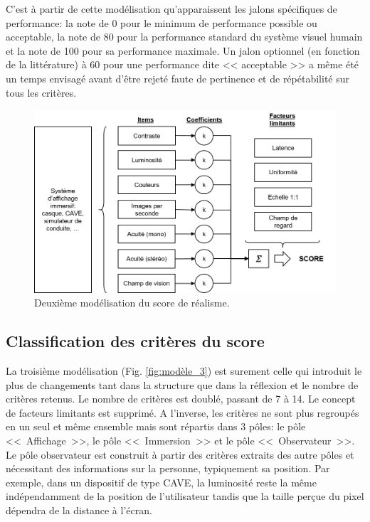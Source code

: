 	\par C'est à partir de cette modélisation qu'apparaissent les jalons spécifiques de performance: la note de 0 pour le minimum de performance possible ou acceptable, la note de 80 pour la performance standard du système visuel humain et la note de 100 pour sa performance maximale. Un jalon optionnel (en fonction de la littérature) à 60 pour une performance dite << acceptable >> a même été un temps envisagé avant d'être rejeté faute de pertinence et de répétabilité sur tous les critères.
	
	\begin{figure}[h]
		\centering
		\includegraphics[scale=.8]{Figures/Modele2_2}
		\caption{Deuxième modélisation du score de réalisme.}
		\label{fig:modèle_2}
	\end{figure}
	
	\subsection{Classification des critères du score}
	\par La troisième modélisation (Fig. \ref{fig:modèle_3}) est surement celle qui introduit le plus de changements tant dans la structure que dans la réflexion et le nombre de critères retenus. Le nombre de critères est doublé, passant de 7 à 14. Le concept de facteurs limitants est supprimé. A l'inverse, les critères ne sont plus regroupés en un seul et même ensemble mais sont répartis dans 3 pôles: le pôle <<~Affichage~>>, le pôle <<~Immersion~>> et le pôle <<~Observateur~>>. Le pôle observateur est construit à partir des critères extraits des autre pôles et nécessitant des informations sur la personne, typiquement sa position. Par exemple, dans un dispositif de type CAVE, la luminosité reste la même indépendamment de la position de l'utilisateur tandis que la taille perçue du pixel dépendra de la distance à l'écran. 
	
